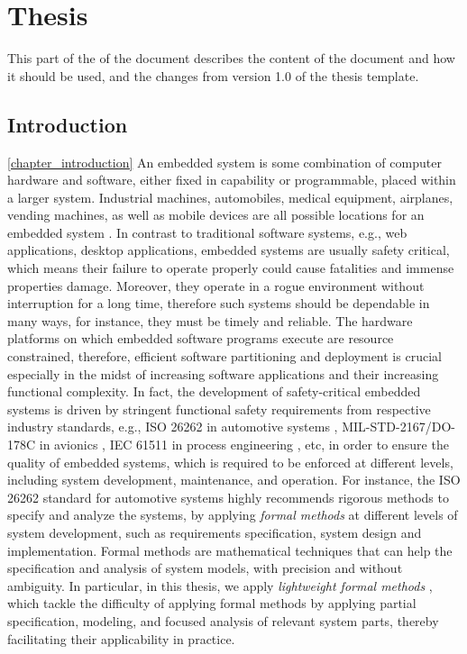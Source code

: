 \part{Thesis}%
This part of the of the document describes the content of the document and how it should be used, and the changes from version 1.0 of the thesis template.
\chapter{Introduction} \ref{chapter_introduction}
An embedded system is some combination of computer hardware and software, either fixed in capability or programmable, placed within a larger system. Industrial machines, automobiles, medical equipment, airplanes, vending machines, as well as mobile devices are all possible locations for an embedded system  \cite{WangJiacun2017RES}. In contrast to traditional software systems, e.g., web applications, desktop applications, embedded systems are usually safety critical, which means their failure to operate properly could cause fatalities and immense properties damage. Moreover, they operate in a rogue environment without interruption for a long time, therefore such systems should be dependable in many ways, for instance, they must be timely and reliable. The hardware platforms on which embedded software programs execute are resource constrained, therefore, efficient software partitioning and deployment is crucial especially in the midst of increasing software applications and their increasing functional complexity. In fact, the development of safety-critical embedded systems is driven by stringent functional safety requirements from respective industry standards, e.g., ISO 26262  in automotive systems \cite{iso201126262}, MIL-STD-2167/DO-178C in avionics \cite{Wang2016DevelopingDO-178Cb}, IEC 61511 in process engineering \cite{bond2002iec}, etc, in order to ensure the quality of embedded systems, which is required to be enforced at different levels, including system development, maintenance, and operation. For instance, the ISO 26262 standard for automotive systems highly recommends rigorous methods to specify and analyze the systems, by applying \textit{formal methods} at different levels of system development, such as requirements specification, system design and implementation. Formal methods \cite{OreganUndergraduateScience} are mathematical techniques that can help the specification and analysis of system models, with precision and without ambiguity. In particular, in this thesis, we apply \textit{lightweight formal methods} \cite{lightweigh2001,Agerholm1999AMethods}, which tackle the difficulty of applying formal methods by applying partial specification, modeling, and focused analysis of relevant system parts, thereby facilitating their applicability in practice. 

